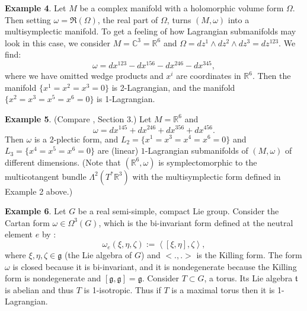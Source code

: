 \documentclass[a4paper,12pt,leqno]{article}
\begin{document}
\noindent \textbf{Example 4}. Let $M$ be a complex manifold with a holomorphic volume form 
$\Omega$. Then setting $\omega=\Re(\Omega)$, the real part of $\Omega$, 
turns $(M,\omega)$ into a multisymplectic manifold. To get a feeling of how Lagrangian submanifolds may look in this case,
we consider $M=\mathbb{C}^3=\mathbb{R}^6$ and $\Omega=dz^1\wedge dz^2 \wedge dz^3 = dz^{123}$. We find:
\begin{equation*}
\omega=dx^{123}-dx^{156}-dx^{246}-dx^{345},
\end{equation*}
\newline
where we have omitted wedge products and $x^i$ are coordinates in $\mathbb{R}^6$. Then the manifold $\{x^1=x^2=x^3=0\}$ 
is 2-Lagrangian, and the manifold $\{x^2=x^3=x^5=x^6=0\}$ is 1-Lagrangian. \newline

\noindent \textbf{Example 5}. (Compare \cite{cil1999}, Section 3.) 
Let $M=\mathbb{R}^6$ and 
\begin{equation*}
\omega=dx^{145}+dx^{246}+dx^{356}+dx^{456}.
\end{equation*}
\newline
Then $\omega$ is a $2$-plectic form, and $L_2=\{ x^1=x^3=x^4=x^6=0 \}$ and 
$L_3=\{ x^4=x^5=x^6= 0\}$ are (linear)
$1$-Lagrangian submanifolds of $(M,\omega)$ of different dimensions. (Note that $(\mathbb{R}^6, \omega)$
is symplectomorphic to the multicotangent bundle $\Lambda^2(T^*\mathbb{R}^3)$ with the multisymplectic 
form defined in Example 2 above.)
\newline



\noindent \textbf{Example 6}. Let $G$ be a real semi-simple, compact Lie group. Consider the Cartan form $\omega\in\Omega^3(G)$, 
which is the bi-invariant form defined at the neutral element $e$ by :
\begin{equation*}
\omega_e(\xi,\eta,\zeta):=\left<[\xi,\eta],\zeta\right>,
\end{equation*}
where $\xi,\eta,\zeta\in \mathfrak{g}$ (the Lie algebra of $G$) and $<.,.>$ is the Killing form. The form $\omega$ is closed because it is 
bi-invariant, and it is nondegenerate because the Killing form is nondegenerate and $[\mathfrak{g},\mathfrak{g}]=\mathfrak{g}$. 
Consider $T\subset G$, a torus. Its Lie algebra $\mathfrak{t}$ is abelian and thus $T$ is 1-isotropic. Thus if $T$ is a maximal torus then 
it is 1-Lagrangian. 


\end{document}
